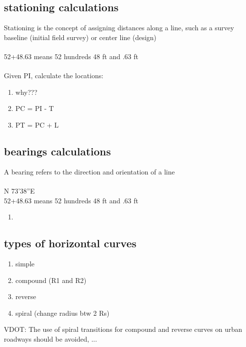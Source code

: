 \documentclass{article}
\begin{document}
  \subsection{stationing calculations}
  Stationing is the concept of assigning distances along a line, such as a survey baseline (initial field survey) or center line (design) \\
  \\
  52+48.63 means 52 hundreds 48 ft and .63 ft\\
  \\
  Given PI, calculate the locations:
  \begin{enumerate}
    \item why???
    \item PC = PI - T
    \item PT = PC + L
  \end{enumerate}


  \subsection{bearings calculations}
  A bearing refers to the direction and orientation of a line\\
  \\
  N 73'38''E
  \\
  52+48.63 means 52 hundreds 48 ft and .63 ft
  \begin{enumerate}
    \item 
  \end{enumerate}


  \subsection{types of horizontal curves}
  \begin{enumerate}
    \item simple 
    \item compound (R1 and R2)
    \item reverse 
    \item spiral (change radius btw 2 Rs)
  \end{enumerate}
  VDOT: The use of spiral transitions for compound and reverse curves on urban roadways should be avoided, ...
\end{document}
